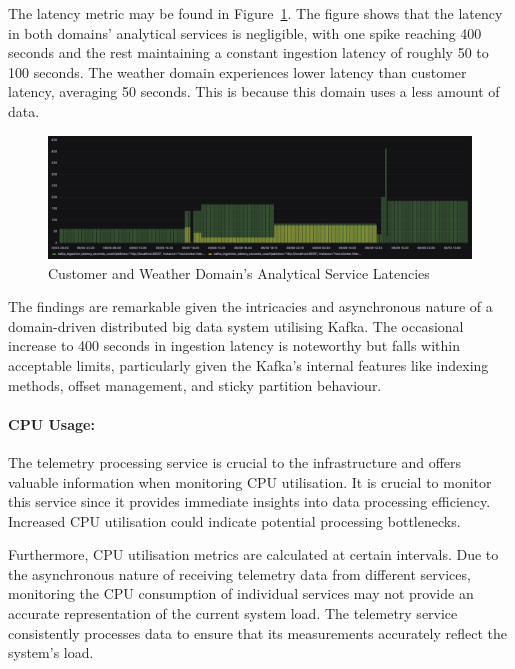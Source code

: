 \documentclass[journal]{IEEEtran}
\begin{document}
The latency metric may be found in Figure~\ref{cusetomerAndWeatherDomainAnalyaticalServicesLatencies}. The figure shows that the latency in both domains' analytical services is negligible, with one spike reaching 400 seconds and the rest maintaining a constant ingestion latency of roughly 50 to 100 seconds. The weather domain experiences lower latency than customer latency, averaging 50 seconds. This is because this domain uses a less amount of data.

\begin{figure}[h]
  \centering
  \includegraphics[width=\textwidth]{images/customer-and-weather-domain-analytics-service-latency.png}
  \caption{Customer and Weather Domain's Analytical Service Latencies}
  \label{cusetomerAndWeatherDomainAnalyaticalServicesLatencies}
\end{figure}

The findings are remarkable given the intricacies and asynchronous nature of a domain-driven distributed big data system utilising Kafka. The occasional increase to 400 seconds in ingestion latency is noteworthy but falls within acceptable limits, particularly given the Kafka's internal features like indexing methods, offset management, and sticky partition behaviour.

\paragraph{CPU Usage:} \label{cpuUsageInS1}   

The telemetry processing service is crucial to the infrastructure and offers valuable information when monitoring CPU utilisation. It is crucial to monitor this service since it provides immediate insights into data processing efficiency. Increased CPU utilisation could indicate potential processing bottlenecks. 

Furthermore, CPU utilisation metrics are calculated at certain intervals. Due to the asynchronous nature of receiving telemetry data from different services, monitoring the CPU consumption of individual services may not provide an accurate representation of the current system load. The telemetry service consistently processes data to ensure that its measurements accurately reflect the system's load. 
\end{document}
